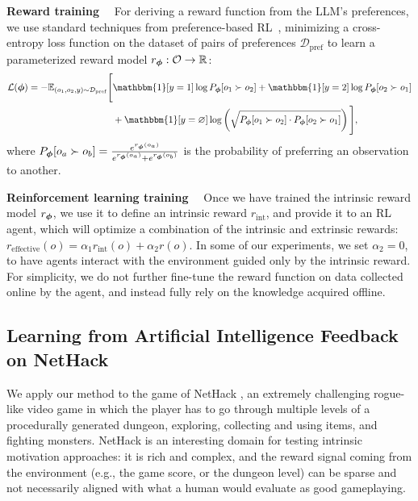 \documentclass{article} %
\begin{document}
\textbf{Reward training}~~
For deriving a reward function from the LLM's preferences, we use standard techniques from preference-based RL~\citep{Wirth2017}, minimizing a cross-entropy loss function on the dataset of pairs of preferences $\mathcal{D}_\text{pref}$ to learn a parameterized reward model $r_{\bm{\phi}} : \mathcal O \to \mathbb R$:
\begin{equation}
\label{eq:rewloss}
\begin{aligned}
        \mathcal L (\vphi) = - \mathbb{E}_{(o_1, o_2, y) \sim \mathcal{D}_\text{pref}}   \Bigg[        & \mathbbm{1}[ y = 1 ] \log  P_\vphi[o_1 \succ o_2] + \mathbbm{1}[ y = 2 ] \log  P_\vphi[o_2 \succ o_1] \\
        & + \mathbbm{1}[ y = \varnothing ]   \log \left (\sqrt{P_\vphi[o_1 \succ o_2] \cdot P_\vphi[o_2 \succ o_1]} \right) \Bigg],
\end{aligned}
\end{equation}
where $P_{\bm{\phi}}[o_a \succ o_b] =  \frac{e^{r_{\bm{\phi}}(o_a)}}{e^{r_{\bm{\phi}}(o_a)} + e^{r_{\bm{\phi}}(o_b)}}$ is the probability of preferring an observation to another.



\textbf{Reinforcement learning training}~~
Once we have trained the intrinsic reward model $r_{\bm{\phi}}$, we use it to define an intrinsic reward $r_\text{int}$, and provide it to an RL agent, which will optimize a combination of the intrinsic and extrinsic rewards: $r_\text{effective}(o) = \alpha_1 r_\text{int} (o) + \alpha_2 r (o)$.
In some of our experiments, we set $\alpha_2=0$, to have agents interact with the environment guided only by the intrinsic reward. For simplicity, we do not further fine-tune the reward function on data collected online by the agent, and instead fully rely on the knowledge acquired offline. 

\subsection{Learning from Artificial Intelligence Feedback on NetHack}
We apply our method to the game of NetHack \citep{KuttlerNMRSGR20}, an extremely challenging rogue-like video game in which the player has to go through multiple levels of a procedurally generated dungeon, exploring, collecting and using items, and fighting monsters. 
NetHack is an interesting domain for testing intrinsic motivation approaches: it is rich and complex, and the reward signal coming from the environment (e.g., the game score, or the dungeon level) can be sparse and not necessarily aligned with what a human would evaluate as good gameplaying.
\end{document}
